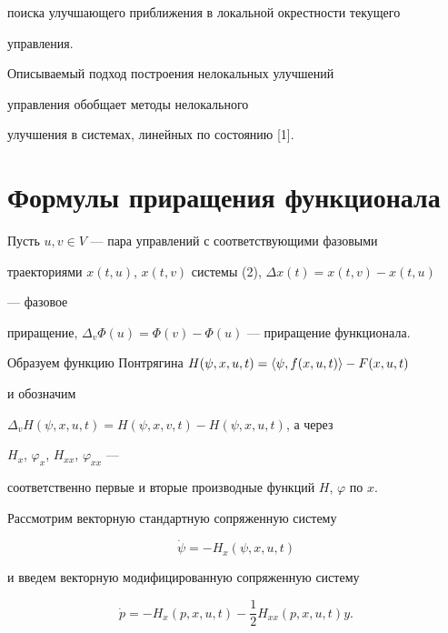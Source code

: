 поиска улучшающего приближения в локальной окрестности текущего 


управления.





Описываемый подход построения нелокальных улучшений 


управления обобщает методы нелокального 


улучшения в системах, линейных по состоянию [1].





\section{Формулы приращения функционала}





Пусть $u,v\in V$ --- пара управлений с соответствующими фазовыми


траекториями $x(t,u)$, $x(t,v)$ системы (2), $\Delta x(t)=x(t,v)-x(t,u)$ 


--- фазовое 


приращение, $\Delta_v\Phi(u)=\Phi(v)-\Phi(u)$ --- приращение функционала. 





Образуем функцию Понтрягина $H(\psi,x,u,t)=\langle\psi,f(x,u,t)\rangle-F(x,u,t)$


и обозначим\linebreak


$\Delta_v H(\psi,x,u,t)=H(\psi,x,v,t)-H(\psi,x,u,t)$, а через 


$H_x$, $\varphi_x$, $H_{xx}$, $\varphi_{xx}$ ---


соответственно первые и вторые производные функций $H$, $\varphi$ по $x$. 





Рассмотрим векторную стандартную сопряженную систему 


\begin{equation}


\Dot\psi=-H_x(\psi,x,u,t)


\end{equation}


и введем векторную модифицированную сопряженную систему


\begin{equation}


\Dot p=-H_x(p,x,u,t)-\frac{1}{2}H_{xx}(p,x,u,t)y.


\end{equation}






